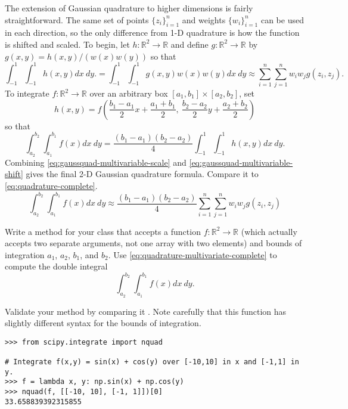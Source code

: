 The extension of Gaussian quadrature to higher dimensions is fairly straightforward.
The same set of points $\{z_i\}_{i=1}^n$ and weights $\{w_i\}_{i=1}^n$ can be used in each direction, so the only difference from 1-D quadrature is how the function is shifted and scaled.
To begin, let $h:\mathbb{R}^2\rightarrow\mathbb{R}$ and define $g:\mathbb{R}^2\rightarrow\mathbb{R}$ by $g(x,y) = h(x,y)/(w(x)w(y))$ so that
\begin{equation}
\int_{-1}^1\int_{-1}^1 h(x,y)dx\:dy.
= \int_{-1}^1\int_{-1}^1 g(x,y)w(x)w(y)dx\:dy
\approx \sum_{i=1}^n \sum_{j=1}^n w_i w_j g(z_i,z_j).
\label{eq:gaussquad-multivariable-scale}
\end{equation}
To integrate $f:\mathbb{R}^2\rightarrow\mathbb{R}$ over an arbitrary box $[a_1,b_1]\times[a_2,b_2]$, set
\[
h(x,y) = f\left(\frac{b_1 - a_1}{2}x + \frac{a_1 + b_1}{2},\
                \frac{b_2 - a_2}{2}y + \frac{a_2 + b_2}{2}\right)
\]
so that
\begin{equation}
\int_{a_2}^{b_2}\int_{a_1}^{b_1} f(x) dx\:dy
= \frac{(b_1 - a_1) (b_2 - a_2)}{4}\int_{-1}^1\int_{-1}^1 h(x,y)dx\:dy.
\label{eq:gaussquad-multivariable-shift}
\end{equation}
Combining \eqref{eq:gaussquad-multivariable-scale} and \eqref{eq:gaussquad-multivariable-shift} gives the final 2-D Gaussian quadrature formula.
Compare it to \eqref{eq:quadrature-complete}.
\begin{equation}
\int_{a_2}^{b_2}\int_{a_1}^{b_1} f(x) dx\:dy
\approx \frac{(b_1 - a_1) (b_2 - a_2)}{4}
\sum_{i=1}^n \sum_{j=1}^n w_i w_j g(z_i,z_j)
\label{eq:quadrature-multivariate-complete}
\end{equation}

\begin{problem}
Write a method for your class that accepts a function $f:\mathbb{R}^2\rightarrow\mathbb{R}$ (which actually accepts two separate arguments, not one array with two elements) and bounds of integration $a_1$, $a_2$, $b_1$, and $b_2$.
Use \eqref{eq:quadrature-multivariate-complete} to compute the double integral
\[\int_{a_2}^{b_2}\int_{a_1}^{b_1} f(x) dx\:dy.\]

Validate your method by comparing it .
Note carefully that this function has slightly different syntax for the bounds of integration.
\begin{lstlisting}
>>> from scipy.integrate import nquad

# Integrate f(x,y) = sin(x) + cos(y) over [-10,10] in x and [-1,1] in y.
>>> f = lambda x, y: np.sin(x) + np.cos(y)
>>> nquad(f, [[-10, 10], [-1, 1]])[0]
33.658839392315855
\end{lstlisting}
\end{problem}

